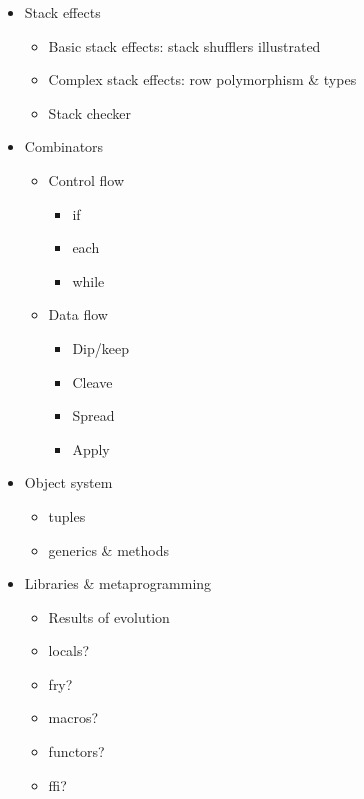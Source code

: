 \begin{itemize}

\item Stack effects
      \begin{itemize}
        \item Basic stack effects: stack shufflers illustrated
        \item Complex stack effects: row polymorphism \& types
        \item Stack checker
      \end{itemize}

\item Combinators
      \begin{itemize}
        \item Control flow
              \begin{itemize}
                \item if
                \item each
                \item while
              \end{itemize}
        \item Data flow
              \begin{itemize}
                \item Dip/keep
                \item Cleave
                \item Spread
                \item Apply
              \end{itemize}
      \end{itemize}

\item Object system
      \begin{itemize}
        \item tuples
        \item generics \& methods
      \end{itemize}

\item Libraries \& metaprogramming
      \begin{itemize}
        \item Results of evolution
        \item locals?
        \item fry?
        \item macros?
        \item functors?
        \item ffi?
      \end{itemize}

\end{itemize}


